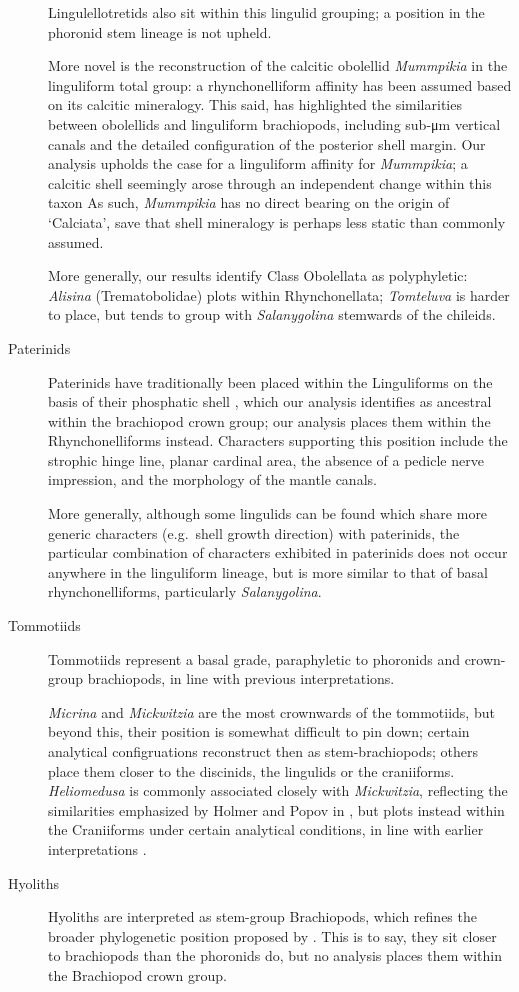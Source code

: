 \documentclass[openany]{book}
\theoremstyle{definition}
\theoremstyle{definition}
\theoremstyle{definition}
\theoremstyle{remark}
\begin{document}
\begin{description}
Lingulellotretids also sit within this lingulid grouping; a position in
the phoronid stem lineage \citep[advocated
by][]{Balthasar2009EarlyCambrian} is not upheld.

More novel is the reconstruction of the calcitic obolellid
\emph{Mummpikia} in the linguliform total group: a rhynchonelliform
affinity has been assumed based on its calcitic mineralogy. This said,
\citet{Balthasar2008iMummpikia} has highlighted the similarities between
obolellids and linguliform brachiopods, including sub-μm vertical canals
and the detailed configuration of the posterior shell margin. Our
analysis upholds the case for a linguliform affinity for
\emph{Mummpikia}; a calcitic shell seemingly arose through an
independent change within this taxon As such, \emph{Mummpikia} has no
direct bearing on the origin of `Calciata', save that shell mineralogy
is perhaps less static than commonly assumed.

More generally, our results identify Class Obolellata as polyphyletic:
\emph{Alisina} (Trematobolidae) plots within Rhynchonellata;
\emph{Tomteluva} is harder to place, but tends to group with
\emph{Salanygolina} stemwards of the chileids.
\item[Paterinids]
Paterinids have traditionally been placed within the Linguliforms on the
basis of their phosphatic shell \citep{Williams2007Supplement}, which
our analysis identifies as ancestral within the brachiopod crown group;
our analysis places them within the Rhynchonelliforms instead.
Characters supporting this position include the strophic hinge line,
planar cardinal area, the absence of a pedicle nerve impression, and the
morphology of the mantle canals.

More generally, although some lingulids can be found which share more
generic characters (e.g.~shell growth direction) with paterinids, the
particular combination of characters exhibited in paterinids does not
occur anywhere in the linguliform lineage, but is more similar to that
of basal rhynchonelliforms, particularly \emph{Salanygolina}.
\item[Tommotiids]
Tommotiids represent a basal grade, paraphyletic to phoronids and
crown-group brachiopods, in line with previous interpretations.

\emph{Micrina} and \emph{Mickwitzia} are the most crownwards of the
tommotiids, but beyond this, their position is somewhat difficult to pin
down; certain analytical configruations reconstruct then as
stem-brachiopods; others place them closer to the discinids, the
lingulids or the craniiforms. \emph{Heliomedusa} is commonly associated
closely with \emph{Mickwitzia}, reflecting the similarities emphasized
by Holmer and Popov in \citet{Williams2007Supplement}, but plots instead
within the Craniiforms under certain analytical conditions, in line with
earlier interpretations \citep{Williams2000LinguliformeaCraniiformea}.
\item[Hyoliths]
Hyoliths are interpreted as stem-group Brachiopods, which refines the
broader phylogenetic position proposed by
\citet{Moysiuk2017Hyolithsare}. This is to say, they sit closer to
brachiopods than the phoronids do, but no analysis places them within
the Brachiopod crown group.


\end{description}
\end{document}

